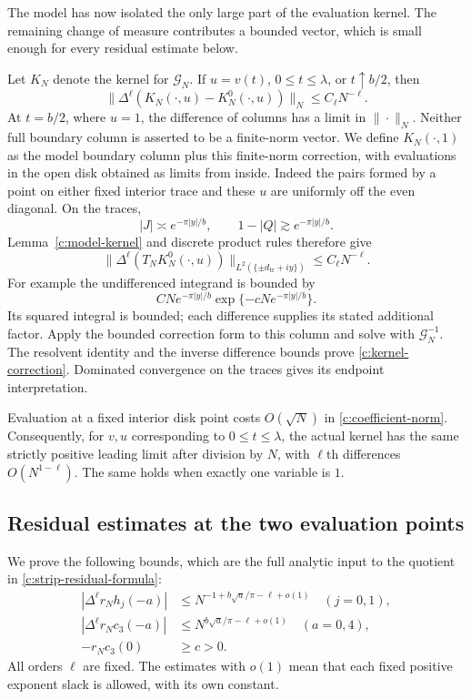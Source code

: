 The model has now isolated the only large part of the evaluation
kernel.  The remaining change of measure contributes a bounded vector,
which is small enough for every residual estimate below.

Let $K_N$ denote the kernel for $\mathcal G_N$.  If
$u=v(t)$, $0\le t\le\lambda$, or $t\uparrow b/2$, then
\begin{equation}\label{c:kernel-correction}
 \|\Delta^\ell(K_N(\cdot,u)-K_N^0(\cdot,u))\|_N
 \le C_\ell N^{-\ell}.
\end{equation}
At $t=b/2$, where $u=1$, the difference of columns has a limit in
$\|\cdot\|_N$.  Neither full boundary column is asserted to be a
finite-norm vector.  We define $K_N(\cdot,1)$ as the model boundary
column plus this finite-norm correction, with evaluations in the open
disk obtained as limits from inside.
Indeed the pairs formed by a point on either fixed interior trace and
these $u$ are uniformly off the even diagonal.  On the traces,
\[
 |J|\asymp e^{-\pi|y|/b},\qquad
 1-|Q|\gtrsim e^{-\pi|y|/b}.
\]
Lemma~\ref{c:model-kernel} and discrete product rules therefore give
\[
 \|\Delta^\ell(T_NK_N^0(\cdot,u))\|_{L^2(\{\pm d_{\mathrm{tr}}+iy\})}
 \le C_\ell N^{-\ell}.
\]
For example the undifferenced integrand is bounded by
\[
 CN e^{-\pi|y|/b}\exp\{-cNe^{-\pi|y|/b}\}.
\]
Its squared integral is bounded; each difference supplies its stated additional
factor.  Apply the bounded correction form to this column and solve
with $\mathcal G_N^{-1}$.  The resolvent identity and the inverse
difference bounds prove \eqref{c:kernel-correction}.  Dominated
convergence on the traces gives its endpoint interpretation.

Evaluation at a fixed interior disk point costs $O(\sqrt N)$ in
\eqref{c:coefficient-norm}.  Consequently, for $v,u$ corresponding to
$0\le t\le\lambda$, the actual kernel has the same strictly positive
leading limit after division by $N$, with $\ell$th differences
$O(N^{1-\ell})$.  The same holds when exactly one variable is $1$.

\subsection{Residual estimates at the two evaluation points}

We prove the following bounds, which are the full analytic input to the
quotient in \eqref{c:strip-residual-formula}:
\begin{equation}\label{c:residual-estimates}
 \begin{split}
 |\Delta^\ell r_Nh_j(-a)|
     &\le N^{-1+b\sqrt a/\pi-\ell+o(1)}\quad(j=0,1),\\
 |\Delta^\ell r_Nc_3(-a)|
     &\le N^{b\sqrt a/\pi-\ell+o(1)}\quad(a=0,4),\\
 -r_Nc_3(0)&\ge c>0.
 \end{split}
\end{equation}
All orders $\ell$ are fixed.  The estimates with $o(1)$ mean that
each fixed positive exponent slack is allowed, with its own constant.

